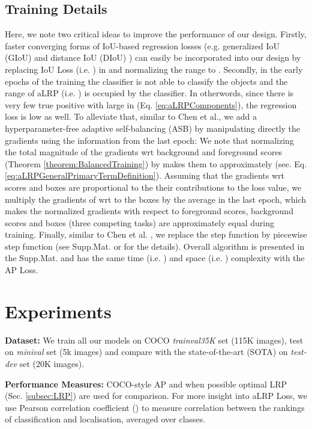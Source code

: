 \documentclass{article}
\begin{document}
{\subsection{Training Details}
\label{subsec:TrainingDetails}
Here, we note two critical ideas to improve the performance of our design. Firstly, faster converging forms of IoU-based regression losses (e.g. generalized IoU (GIoU) \cite{GIoULoss} and distance IoU (DIoU) \cite{DIoULoss}) can easily be incorporated into our design by replacing IoU Loss (i.e. ) in  and normalizing the range to . Secondly, in the early epochs of the training the classifier is not able to classify the objects and the range of aLRP (i.e. ) is occupied by the classifier. In otherwords, since there is very few true positive with large  in  (Eq. \ref{eq:aLRPComponents}), the regression loss is low as well. To alleviate that, similar to Chen et al.\cite{GradNorm}, we add a hyperparameter-free adaptive self-balancing (ASB) by manipulating directly the gradients using the information from the last epoch: We note that normalizing the total magnitude of the gradients wrt background and foreground scores (Theorem \ref{theorem:BalancedTraining}) by   makes them to approximately  (see. Eq. \ref{eq:aLRPGeneralPrimaryTermDefinition}). Assuming that the gradients wrt scores and boxes are proportional to the their contributions to the  loss value, we multiply the gradients of  wrt to the boxes by the average  in the last epoch, which makes the normalized gradients with respect to foreground scores, background scores and boxes (three competing tasks) are approximately equal during training. Finally, similar to Chen et al. \cite{APLoss}, we replace the step function by piecewise step function (see Supp.Mat. or \cite{APLoss} for the details). Overall algorithm is presented in the Supp.Mat. and has the same time (i.e. ) and space (i.e. ) complexity with the AP Loss.  


} \section{Experiments}
\label{sec:Experiments}

\textbf{Dataset:} We train all our models on  COCO \textit{trainval35K} set \cite{COCO} (115K images), test on \textit{minival} set (5k images) and compare with the state-of-the-art (SOTA) on \textit{test-dev} set (20K images). 

\textbf{Performance Measures:} COCO-style AP \cite{COCO} and when possible optimal LRP \cite{LRP} (Sec. \ref{subsec:LRP}) are used for comparison. For more insight into aLRP Loss, we use Pearson correlation coefficient () to measure correlation between the rankings of classification and localisation, averaged over classes.
\end{document}
